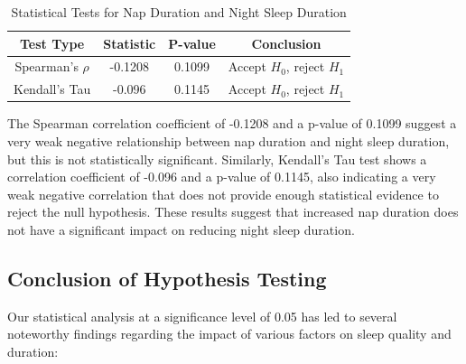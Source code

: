 \documentclass[conference]{IEEEtran}
\begin{document}
\begin{table}[ht]
\centering
\caption{Statistical Tests for Nap Duration and Night Sleep Duration}
\label{tab:hypothesis5}
\begin{tabular}{|c|c|c|c|}
\hline
\textbf{Test Type} & \textbf{Statistic} & \textbf{P-value} & \textbf{Conclusion} \\
\hline
Spearman's \(\rho\) & -0.1208 & 0.1099 & Accept \(H_0\), reject \(H_1\) \\
\hline
Kendall’s Tau & -0.096 & 0.1145 & Accept \(H_0\), reject \(H_1\) \\
\hline
\end{tabular}
\end{table}

The Spearman correlation coefficient of -0.1208 and a p-value of 0.1099 suggest a very weak negative relationship between nap duration and night sleep duration, but this is not statistically significant. Similarly, Kendall's Tau test shows a correlation coefficient of -0.096 and a p-value of 0.1145, also indicating a very weak negative correlation that does not provide enough statistical evidence to reject the null hypothesis. These results suggest that increased nap duration does not have a significant impact on reducing night sleep duration.

\subsection*{Conclusion of Hypothesis Testing}
Our statistical analysis at a significance level of 0.05 has led to several noteworthy findings regarding the impact of various factors on sleep quality and duration:
\end{document}
